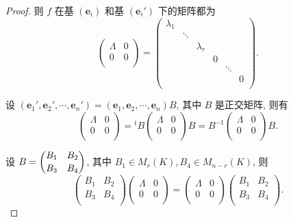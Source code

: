 \documentclass[color=black,device=normal,lang=cn,mode=geye]{elegantnote}
\begin{document}
\begin{proof}
    则 $f$ 在基 $(\boldsymbol{e}_i)$ 和基 $(\boldsymbol{e}_i')$ 下的矩阵都为
    \[\begin{pmatrix}
        \Lambda & 0 \\
        0 & 0 \\
    \end{pmatrix}=\begin{pmatrix}
        \lambda_1 \\
        & \ddots \\
        && \lambda_r \\
        &&& 0 \\
        &&&& \ddots \\
        &&&&& 0 \\
    \end{pmatrix}.\]
    
    设 $(\boldsymbol{e}_1',\boldsymbol{e}_2',\cdots,\boldsymbol{e}_n')=(\boldsymbol{e}_1,\boldsymbol{e}_2,\cdots,\boldsymbol{e}_n)B$, 其中 $B$ 是正交矩阵, 则有
    \[\begin{pmatrix}
        \Lambda & 0 \\
        0 & 0 \\
    \end{pmatrix}={}^tB\begin{pmatrix}
        \Lambda & 0 \\
        0 & 0 \\
    \end{pmatrix}B=B^{-1}\begin{pmatrix}
        \Lambda & 0 \\
        0 & 0 \\
    \end{pmatrix}B.\]

    设 $B=\dbinom{B_1\quad B_2}{B_3\quad B_4}$, 其中 $B_1\in M_r(K),B_4\in M_{n-r}(K)$, 则
    \[\begin{pmatrix}
        B_1 & B_2 \\
        B_3 & B_4 \\
    \end{pmatrix}\begin{pmatrix}
        \Lambda & 0 \\
        0 & 0 \\
    \end{pmatrix}=\begin{pmatrix}
        \Lambda & 0 \\
        0 & 0 \\
    \end{pmatrix}\begin{pmatrix}
        B_1 & B_2 \\
        B_3 & B_4 \\
    \end{pmatrix}.\]


\end{proof}
\end{document}

